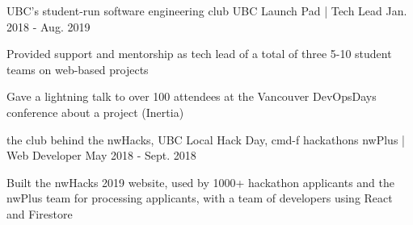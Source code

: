 \begin{cventries}

  \cventry
    {UBC's student-run software engineering club} %
    {UBC Launch Pad | Tech Lead} %
    {} %
    {Jan. 2018 - Aug. 2019} %
    {
      \begin{cvitems} %
        \item {Provided support and mentorship as tech lead of a total of three 5-10 student teams on web-based projects}
        \item {Gave a lightning talk to over 100 attendees at the Vancouver DevOpsDays conference about a project (Inertia)}
      \end{cvitems}
    }

  \cventry
    {the club behind the nwHacks, UBC Local Hack Day, cmd-f hackathons} %
    {nwPlus | Web Developer} %
    {} %
    {May 2018 - Sept. 2018} %
    {
      \begin{cvitems} %
        \item {Built the nwHacks 2019 website, used by 1000+ hackathon applicants and the nwPlus team for processing applicants, with a team of developers using React and Firestore}
      \end{cvitems}
    }

\end{cventries}

